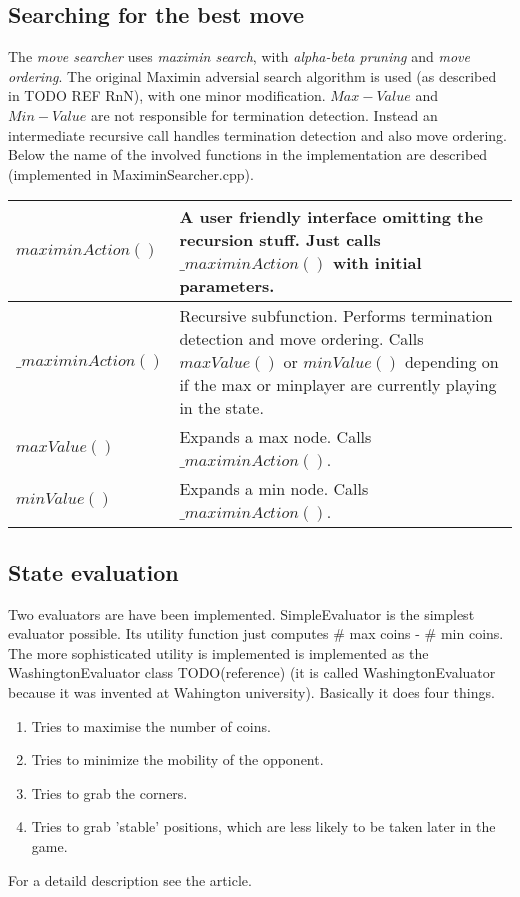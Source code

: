 \documentclass[a4paper,11pt]{article}
\begin{document}
\subsection{Searching for the best move}
The \textit{move searcher} uses \textit{maximin search}, with \textit{alpha-beta pruning} and \textit{move ordering}. The original Maximin adversial search algorithm is used (as described in TODO REF RnN), with one minor modification. $Max-Value$ and $Min-Value$ are not responsible for termination detection. Instead an intermediate recursive call handles termination detection and also move ordering. Below the name of the involved functions in the implementation are described (implemented in MaximinSearcher.cpp).

\begin{tabular}{|l|p{12 cm}|}
\hline
$maximinAction()$ & A user friendly interface omitting the recursion stuff. Just calls $\_maximinAction()$ with initial parameters.
\\ \hline
$\_maximinAction()$ & Recursive subfunction. Performs termination detection and move ordering. Calls $maxValue()$ or $minValue()$ depending on if the max or minplayer are currently playing in the state.
\\ \hline
$maxValue()$ & Expands a max node. Calls $\_maximinAction()$.
\\ \hline
$minValue()$ & Expands a min node. Calls $\_maximinAction()$.
\\ \hline
\end{tabular}

\subsection{State evaluation}
Two evaluators are have been implemented. SimpleEvaluator is the simplest evaluator possible. Its utility function just computes \# max coins - \# min coins. The more sophisticated utility is implemented is implemented as the WashingtonEvaluator class TODO(reference) (it is called WashingtonEvaluator because it was invented at Wahington university). Basically it does four things.
\begin{enumerate}
\item Tries to maximise the number of coins.
\item Tries to minimize the mobility of the opponent.
\item Tries to grab the corners.
\item Tries to grab 'stable' positions, which are less likely to be taken later in the game.
\end{enumerate}
For a detaild description see the article.
\end{document}
